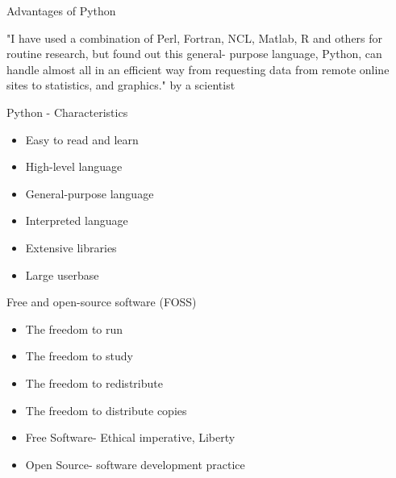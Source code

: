 \begin{frame}{Advantages of Python}
	\begin{beamerboxesrounded}{}
		"I have used a combination of Perl, Fortran, NCL, Matlab, R and others for routine research, but found out this general- purpose language, Python, can handle almost all in an efficient way from requesting data from remote online sites to statistics, and graphics."
		by a scientist
	\end{beamerboxesrounded}
\end{frame}



\begin{frame}{Python - Characteristics}
	\begin{beamerboxesrounded}{}
		\begin{itemize}
			\item Easy to read and learn
			\item High-level language
			\item General-purpose language
			\item Interpreted language
			\item Extensive libraries
			\item Large userbase 
		\end{itemize}
	\end{beamerboxesrounded}
\end{frame}



\begin{frame}{Free and open-source software (FOSS)}
	\begin{beamerboxesrounded}{}
		\begin{itemize}
			\item The freedom to run
			\item The freedom to study 
			\item The freedom to redistribute
			\item The freedom to distribute copies
		\end{itemize}
	\end{beamerboxesrounded}
    	\begin{beamerboxesrounded}{}
    	\begin{itemize}
    		\item Free Software- Ethical imperative, Liberty
    		\item Open Source- software development practice
    	\end{itemize}
    \end{beamerboxesrounded}

\end{frame}


